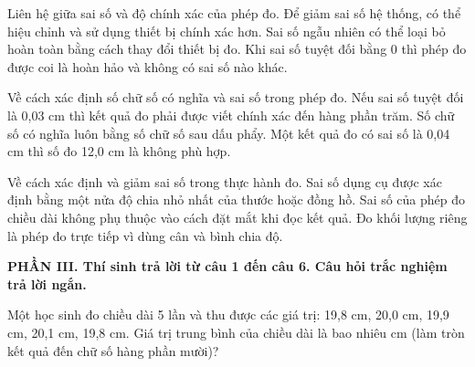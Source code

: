 \begin{ex}
Liên hệ giữa sai số và độ chính xác của phép đo.
{\True Để giảm sai số hệ thống, có thể hiệu chỉnh và sử dụng thiết bị chính xác hơn.}
{Sai số ngẫu nhiên có thể loại bỏ hoàn toàn bằng cách thay đổi thiết bị đo.}
{Khi sai số tuyệt đối bằng 0 thì phép đo được coi là hoàn hảo và không có sai số nào khác.}
\end{ex}

\begin{ex}
Về cách xác định số chữ số có nghĩa và sai số trong phép đo.
{\True Nếu sai số tuyệt đối là 0,03 cm thì kết quả đo phải được viết chính xác đến hàng phần trăm.}
{Số chữ số có nghĩa luôn bằng số chữ số sau dấu phẩy.}
{Một kết quả đo có sai số là 0,04 cm thì số đo 12,0 cm là không phù hợp.}
\end{ex}

\begin{ex}
Về cách xác định và giảm sai số trong thực hành đo.
{\True Sai số dụng cụ được xác định bằng một nửa độ chia nhỏ nhất của thước hoặc đồng hồ.}
{Sai số của phép đo chiều dài không phụ thuộc vào cách đặt mắt khi đọc kết quả.}
{Đo khối lượng riêng là phép đo trực tiếp vì dùng cân và bình chia độ.}
\end{ex}

\vspace{0.4cm}\noindent\textbf{\large PHẦN III. Thí sinh trả lời từ câu 1 đến câu 6. Câu hỏi trắc nghiệm trả lời ngắn.}\par\vspace{0.2cm}
\begin{ex}
Một học sinh đo chiều dài 5 lần và thu được các giá trị: 19,8 cm, 20,0 cm,
19,9 cm, 20,1 cm, 19,8 cm. Giá trị trung bình của chiều dài là bao nhiêu cm (làm tròn kết
quả đến chữ số hàng phần mười)?

\end{ex}

